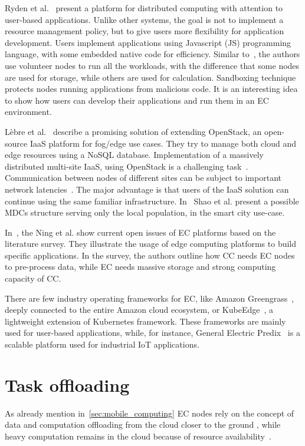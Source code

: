 Ryden et al.~\cite{RydenOCW14} present a platform for distributed computing with attention to user-based applications. Unlike other systems, the goal is not to implement a resource management policy, but to give users more flexibility for application development. Users implement applications using Javascript (JS) programming language, with some embedded native code for efficiency. Similar to~\cite{CiobanuNPDMM19}, the authors use volunteer nodes to run all the workloads, with the difference that some nodes are used for storage, while others are used for calculation. Sandboxing technique protects nodes running applications from malicious code. It is an interesting idea to show how users can develop their applications and run them in an EC environment.

L{\`{e}}bre et al.~\cite{LebrePSD17} describe a promising solution of extending OpenStack, an open-source IaaS platform for fog/edge use cases. They try to manage both cloud and edge resources using a NoSQL database. Implementation of a massively distributed multi-site IaaS, using OpenStack is a challenging task~\cite{LebrePSD17}. Communication between nodes of different sites can be subject to important network latencies~\cite{LebrePSD17}. The major advantage is that users of the IaaS solution can continue using the same familiar infrastructure. In~\cite{ShaoLFJL19} Shao et al. present a possible MDCs structure serving only the local population, in the smart city use-case.

In~\cite{NingLSY20}, the Ning et al. show current open issues of EC platforms based on the literature survey. They illustrate the usage of edge computing platforms to build specific applications. In the survey, the authors outline how CC needs EC nodes to pre-process data, while EC needs massive storage and strong computing capacity of CC.

There are few industry operating frameworks for EC, like Amazon Greengrass~\cite{kurniawan_2018}, deeply connected to the entire Amazon cloud ecosystem, or KubeEdge~\cite{KubeEdge}, a lightweight extension of Kubernetes framework. These frameworks are mainly used for user-based applications, while, for instance, General Electric Predix~\cite{GE_Predix} is a scalable platform used for industrial IoT applications.
%
%
\section{Task offloading}\label{sec:task_offloading}
%
As already mention in~\ref{sec:mobile_computing} EC nodes rely on the concept of data and computation offloading from the cloud closer to the ground \cite{KhuneP19}, while heavy computation remains in the cloud because of resource availability~\cite{NingLSY20}. 

